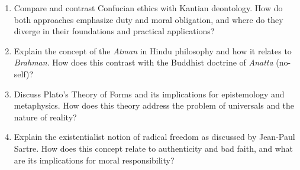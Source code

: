 \documentclass[11pt]{article}
\begin{document}
\begin{enumerate}[label=\textbf{\arabic*.}]
  \item Compare and contrast Confucian ethics with Kantian deontology. How do both approaches 
  emphasize duty and moral obligation, and where do they diverge in their foundations and 
  practical applications?

  \item Explain the concept of the \textit{Atman} in Hindu philosophy and how it relates to 
  \textit{Brahman}. How does this contrast with the Buddhist doctrine of \textit{Anatta} (no-self)?

  \item Discuss Plato's Theory of Forms and its implications for epistemology and metaphysics. 
  How does this theory address the problem of universals and the nature of reality?

  \item Explain the existentialist notion of radical freedom as discussed by Jean-Paul Sartre. 
  How does this concept relate to authenticity and bad faith, and what are its implications for 
  moral responsibility?

\end{enumerate}
\end{document}
